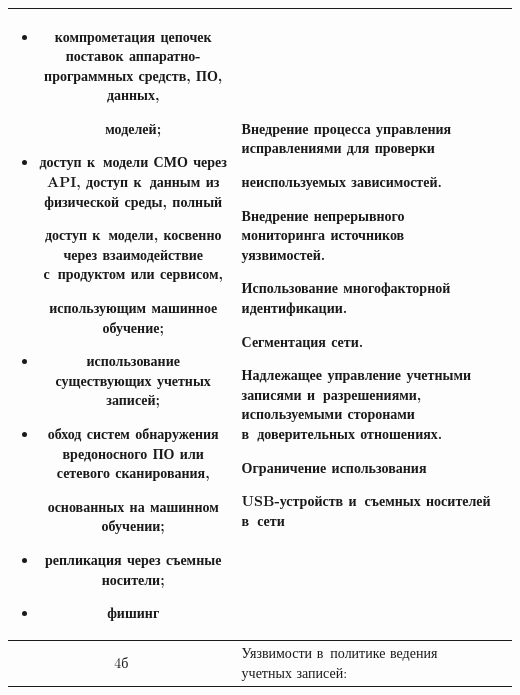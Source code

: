 \begin{table}
\begin{center}
\begin{tabular}{|c|p{64mm}|p{52mm}|}
\begin{itemize}

\addtolength{\itemsep}{-6pt}

\item компрометация цепочек поставок аппаратно-программных средств, ПО, данных, 

моделей;

\item доступ к~модели СМО через API, доступ к~данным из физической среды, полный 

доступ к~модели, косвенно через взаимодействие с~продуктом или сервисом, 

использующим машинное обуче\-ние;

\item использование существующих учетных записей;

\item обход систем обнаружения вредоносного ПО или сетевого сканирования, 

основанных на машинном обучении;

\item репликация через съемные носители;

\item фишинг\vspace*{-6pt}

\end{itemize}&Внедрение процесса управ\-ле\-ния ис\-прав\-ле\-ни\-ями для проверки 

не\-ис\-поль\-зу\-емых зависимостей.\newline

Внедрение непрерывного мониторинга источников уязвимостей.\newline

Использование многофакторной идентификации.\newline

Сегментация сети.\newline

Надлежащее управление учетными записями и~разрешениями, используемыми сторонами в~доверительных отношениях.\newline

Ограничение использования 

 USB-устройств и~съемных носителей в~сети\\

\hline

4б&Уязвимости в~политике ведения учетных записей:\vspace*{-6pt}


\end{tabular}
\end{center}
\end{table}

